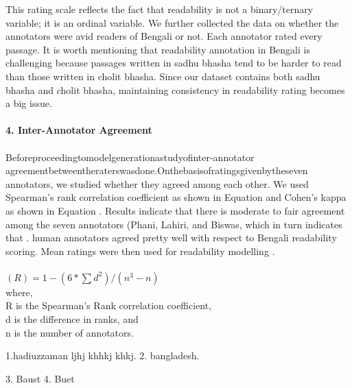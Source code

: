 \documentclass[9pt]{article}
\begin{document}
\hspace{2cm}
This rating scale reﬂects the fact that readability is not a binary/ternary variable; it is an ordinal variable. We further collected the data on whether the annotators were avid readers of Bengali or not. Each annotator rated every passage. It is worth mentioning that readability annotation in Bengali is challenging because passages written in sadhu bhasha tend to be harder to read than those written in cholit bhasha. Since our dataset contains both sadhu bhasha and cholit bhasha, maintaining consistency in readability rating becomes a big issue.\\
\\
\hspace{2cm}
\huge{\textbf{4. Inter-Annotator Agreement}}\\
\\
Beforeproceedingtomodelgenerationastudyofinter-annotator agreementbetweentheraterswasdone.Onthebasisofratingsgivenbytheseven annotators, we studied whether they agreed among each other. We used Spearman’s rank correlation\cite{B} coeﬃcient  as shown in Equation  and Cohen’s kappa  as shown in Equation . Results indicate that there is\cite{B} moderate to fair agreement among the seven annotators (Phani, Lahiri, and Biswas, which in turn indicates that \cite{C}. human annotators agreed pretty well with respect to Bengali readability scoring. Mean ratings were then used for readability modelling \cite{D}.
\\
\\

$(R)=1-(6*\sum{d^2})/(n^3-n)$
\\
where,\\
R is the Spearman’s Rank correlation coeﬃcient, \\
d is the diﬀerence in ranks, and \\
n is the number of annotators.\\

\begin{thebibliography}
	
1.hadiuzzaman  ljhj  khhkj      khkj.
  2.      bangladesh.
        
    3.    Baust
      4.  Buet
\end{thebibliography}
\end{document}
